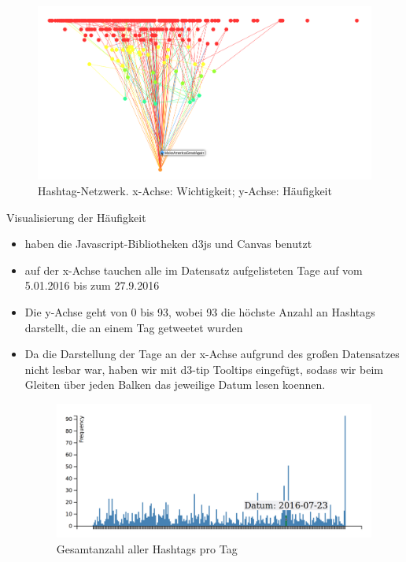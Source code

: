 \documentclass[paper=a4, english, ngerman, romanian]{scrartcl}
\begin{document}
\begin{itemize}
		\begin{figure}[H]
			\centering
			\caption{Hashtag-Netzwerk. x-Achse: Wichtigkeit; y-Achse: Häufigkeit}
			\includegraphics[scale=0.25]{src/Netzwerk}
			
		\end{figure}

Visualisierung der Häufigkeit 

\begin{itemize}
\item haben die Javascript-Bibliotheken d3js und Canvas benutzt
\item auf der x-Achse tauchen alle im Datensatz aufgelisteten Tage auf vom 5.01.2016 bis zum 27.9.2016
\item Die y-Achse geht von 0 bis 93, wobei 93 die höchste Anzahl an Hashtags darstellt, die an einem Tag getweetet wurden
\item Da die Darstellung der Tage an der x-Achse aufgrund des großen Datensatzes nicht lesbar war, haben wir mit d3-tip Tooltips eingefügt, sodass wir beim Gleiten über jeden Balken das jeweilige Datum lesen koennen.

		\begin{figure}[H]
			\centering
			\caption{Gesamtanzahl aller Hashtags pro Tag}
			\includegraphics[scale=0.25]{src/Anzahl_h}
			

\end{figure}
\end{itemize}
\end{itemize}
\end{document}
